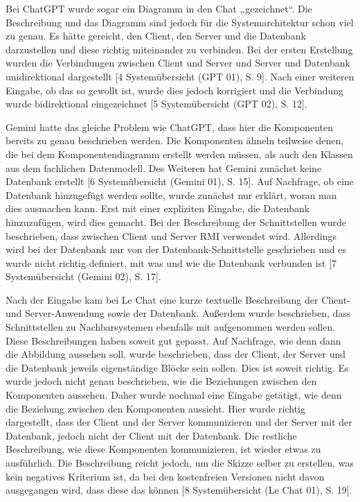 Bei ChatGPT wurde sogar ein Diagramm in den Chat „gezeichnet“. Die Beschreibung und das Diagramm sind jedoch für die Systemarchitektur 
schon viel zu genau. Es hätte gereicht, den Client, den Server und die Datenbank darzustellen und diese richtig miteinander zu verbinden. 
Bei der ersten Erstellung wurden die Verbindungen zwischen Client und Server und Server und Datenbank unidirektional dargestellt 
[4 Systemübersicht (GPT 01), S. 9]. Nach einer weiteren Eingabe, ob das so gewollt ist, wurde dies jedoch korrigiert und die Verbindung 
wurde bidirektional eingezeichnet [5 Systemübersicht (GPT 02), S. 12].

Gemini hatte das gleiche Problem wie ChatGPT, dass hier die Komponenten bereits zu genau beschrieben werden. Die Komponenten ähneln 
teilweise denen, die bei dem Komponentendiagramm erstellt werden müssen, als auch den Klassen aus dem fachlichen Datenmodell. Des Weiteren 
hat Gemini zunächst keine Datenbank erstellt [6 Systemübersicht (Gemini 01), S. 15]. Auf Nachfrage, ob eine Datenbank hinzugefügt werden 
sollte, wurde zunächst nur erklärt, woran man dies ausmachen kann. Erst mit einer expliziten Eingabe, die Datenbank hinzuzufügen, wird 
dies gemacht. Bei der Beschreibung der Schnittstellen wurde beschrieben, dass zwischen Client und Server RMI verwendet wird. Allerdings 
wird bei der Datenbank nur von der Datenbank-Schnittstelle geschrieben und es wurde nicht richtig definiert, mit was und wie die 
Datenbank verbunden ist [7 Systemübersicht (Gemini 02), S. 17].

Nach der Eingabe kam bei Le Chat eine kurze textuelle Beschreibung der Client- und Server-Anwendung sowie der Datenbank. Außerdem wurde 
beschrieben, dass Schnittstellen zu Nachbarsystemen ebenfalls mit aufgenommen werden sollen. Diese Beschreibungen haben soweit gut 
gepasst. Auf Nachfrage, wie denn dann die Abbildung aussehen soll, wurde beschrieben, dass der Client, der Server und die Datenbank 
jeweils eigenständige Blöcke sein sollen. Dies ist soweit richtig. Es wurde jedoch nicht genau beschrieben, wie die Beziehungen zwischen 
den Komponenten aussehen. Daher wurde nochmal eine Eingabe getätigt, wie denn die Beziehung zwischen den Komponenten aussieht. Hier 
wurde richtig dargestellt, dass der Client und der Server kommunizieren und der Server mit der Datenbank, jedoch nicht der Client mit 
der Datenbank. Die restliche Beschreibung, wie diese Komponenten kommunizieren, ist wieder etwas zu ausführlich. Die Beschreibung reicht 
jedoch, um die Skizze selber zu erstellen, was kein negatives Kriterium ist, da bei den kostenfreien Versionen nicht davon ausgegangen 
wird, dass diese das können [8 Systemübersicht (Le Chat 01), S. 19].

